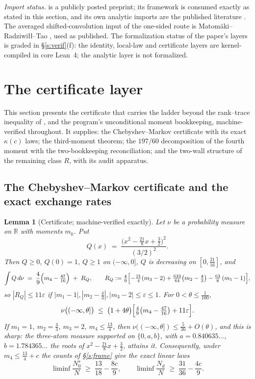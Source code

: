 \documentclass[11pt]{article}
\numberwithin{equation}{section}
\newtheorem{lemma}[theorem]{Lemma}
\theoremstyle{definition}
\theoremstyle{remark}
\begin{document}
\emph{Import status.} \cite{C26} is a publicly posted
preprint; its framework is consumed exactly as stated in this
section, and its own analytic imports are the published
literature \cite{Wei52,IK,Tit86,Mon73,BGST}. The averaged
shifted-convolution input of the one-sided route is
Matom\"aki--Radziwi\l{}\l--Tao \cite{MRT}, used as
published. The formalization status of the paper's layers is
graded in \S\ref{s:verif}(f): the identity, local-law and
certificate layers are kernel-compiled in core Lean~4; the
analytic layer is not formalized.

\section{The certificate layer}\label{s:cert}

This section presents the certificate that carries the ladder
beyond the rank--trace inequality of \cite[Lem.~3.2]{C26}, and
the program's unconditional moment bookkeeping, machine-verified
throughout. It supplies: the Chebyshev--Markov certificate with
its exact $\kappa(c)$ laws; the third-moment theorem; the
$197/60$ decomposition of the fourth moment with the
two-bookkeeping reconciliation; and the two-wall structure of the
remaining class $R$, with its audit apparatus.

\subsection{The Chebyshev--Markov certificate and the exact
exchange rates}

\begin{lemma}[Certificate; machine-verified exactly]\label{l:cert}
Let $\nu$ be a probability measure on $\mathbb R$ with moments
$m_k$. Put
\[
Q(x)\;=\;\frac{\bigl(x^2-\tfrac{21}{8}x+\tfrac32\bigr)^2}{(3/2)^2}.
\]
Then $Q\ge0$, $Q(0)=1$, $Q\ge1$ on $(-\infty,0]$, $Q$ is
decreasing on $[0,\tfrac{21}{16}]$, and
\begin{equation}\label{e:EQ}
\int Q\,d\nu \;=\; \frac{4}{9}\Bigl(m_4-\tfrac{47}{16}\Bigr)
\;+\;R_Q,\qquad
R_Q:=\tfrac{4}{9}\Bigl[-\tfrac{21}{4}(m_3-2)
+\tfrac{633}{64}\bigl(m_2-\tfrac43\bigr)
-\tfrac{63}{8}\,(m_1-1)\Bigr],
\end{equation}
so $|R_Q|\le11\varepsilon$ if $|m_1-1|,|m_2-\tfrac43|,
|m_3-2|\le\varepsilon\le1$. For $0<\theta\le\tfrac1{100}$,
\[
\nu\bigl((-\infty,\theta]\bigr)
\;\le\;\bigl(1+4\theta\bigr)
\Bigl[\tfrac{4}{9}\bigl(m_4-\tfrac{47}{16}\bigr)
+11\varepsilon\Bigr].
\]
If $m_1=1$, $m_2=\tfrac43$, $m_3=2$, $m_4\le\tfrac{13}4$, then
$\nu((-\infty,\theta])\le\tfrac5{36}+O(\theta)$, and this is
sharp: the three-atom measure supported on $\{0,a,b\}$, with
$a=0.840635\ldots$, $b=1.784365\ldots$ the roots of
$x^2-\tfrac{21}8x+\tfrac32$, attains it. Consequently, under
$m_4\le\tfrac{13}4+c$ the counts of \S\ref{s:frame} give the
exact linear laws
\[
\liminf\frac{N_0^{s}}{N}\;\ge\;\frac{13}{18}-\frac{8c}{9},
\qquad
\liminf\frac{N_d}{N}\;\ge\;\frac{31}{36}-\frac{4c}{9}.
\]
\end{lemma}
\end{document}
